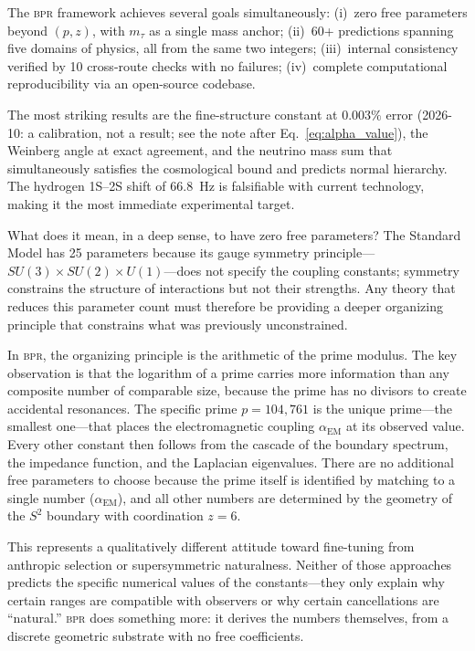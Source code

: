 \documentclass[aps,prd,twocolumn,superscriptaddress,longbibliography,nofootinbib]{revtex4-2}
\newcommand{\Stwo}{S^2}
\newcommand{\alphaEM}{\alpha_{\mathrm{EM}}}
\newcommand{\bpr}{\textsc{bpr}}
\begin{document}
The \bpr{} framework achieves several goals simultaneously:
(i)~zero free parameters beyond $(p, z)$, with $m_\tau$ as a single
mass anchor; (ii)~60+ predictions spanning five domains of physics,
all from the same two integers; (iii)~internal consistency verified
by 10 cross-route checks with no failures; (iv)~complete
computational reproducibility via an open-source codebase.

The most striking results are the fine-structure constant at
$0.003\%$ error (2026-10: a calibration, not a result; see the note after
Eq.~\eqref{eq:alpha_value}), the Weinberg angle at exact agreement, and the
neutrino mass sum that simultaneously satisfies the cosmological
bound and predicts normal hierarchy.  The hydrogen 1S--2S shift of
66.8~Hz is falsifiable with current technology, making it the most
immediate experimental target.

What does it mean, in a deep sense, to have zero free parameters?
The Standard Model has 25 parameters because its gauge symmetry
principle---$SU(3) \times SU(2) \times U(1)$---does not specify the
coupling constants; symmetry constrains the structure of interactions
but not their strengths.  Any theory that reduces this parameter
count must therefore be providing a deeper organizing principle that
constrains what was previously unconstrained.

In \bpr, the organizing principle is the arithmetic of the prime
modulus.  The key observation is that the logarithm of a prime
carries more information than any composite number of comparable
size, because the prime has no divisors to create accidental
resonances.  The specific prime $p = 104{,}761$ is the unique
prime---the smallest one---that places the electromagnetic coupling
$\alphaEM$ at its observed value.  Every other constant then follows
from the cascade of the boundary spectrum, the impedance function,
and the Laplacian eigenvalues.  There are no additional free
parameters to choose because the prime itself is identified by
matching to a single number ($\alphaEM$), and all other numbers are
determined by the geometry of the $\Stwo$ boundary with coordination
$z = 6$.

This represents a qualitatively different attitude toward
fine-tuning from anthropic selection or supersymmetric naturalness.
Neither of those approaches predicts the specific numerical values
of the constants---they only explain why certain ranges are
compatible with observers or why certain cancellations are
``natural.''  \bpr{} does something more: it derives the numbers
themselves, from a discrete geometric substrate with no free
coefficients.
\end{document}
